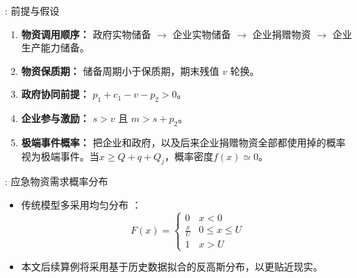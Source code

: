 \documentclass[9pt]{beamer}
\begin{document}
\begin{frame}{\insertsectionhead: 前提与假设}
    \begin{enumerate}
        \item \textbf{物资调用顺序：} 政府实物储备 $\rightarrow$ 企业实物储备 $\rightarrow$ 企业捐赠物资 $\rightarrow$ 企业生产能力储备。
        \item \textbf{物资保质期：} 储备周期小于保质期，期末残值 $v$ 轮换。
        \item \textbf{政府协同前提：} $p_1 + c_1 - v - p_2 > 0$。
        \item \textbf{企业参与激励：} $s > v$ 且 $m > s + p_2$。
        \item \textbf{极端事件概率：} 把企业和政府，以及后来企业捐赠物资全部都使用掉的概率视为极端事件。当$x\geq Q + q + Q_j$，概率密度$f(x) \simeq 0$。
    \end{enumerate}
\end{frame}

\begin{frame}{\insertsectionhead: 应急物资需求概率分布}
    \begin{itemize}
        \item 传统模型多采用均匀分布 \cite{chai2021考虑储备周期,chen2014突发事件灾前应急物资政企联合储备模式,hu2018考虑企业生产能力}：
            \begin{equation} \label{eq:beamer_uniform_cdf}
            F(x) = \begin{cases}
            0 & x < 0 \\
            \frac{x}{U} & 0 \leq x \leq U \\
            1 & x > U
            \end{cases}
            \end{equation}
        \item 本文后续算例将采用基于历史数据拟合的反高斯分布，以更贴近现实。
    \end{itemize}
\end{frame}
\end{document}
